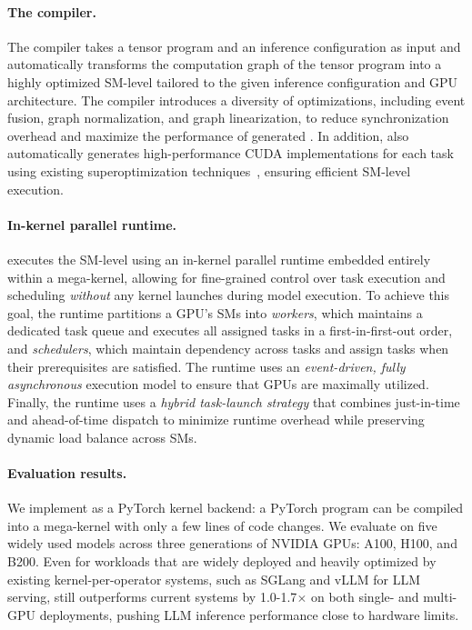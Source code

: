 \paragraph{The \Sys compiler.} The \Sys compiler takes a tensor program and an inference configuration as input and automatically transforms the computation graph of the tensor program into a highly optimized SM-level \graph tailored to the given inference configuration and GPU architecture.
The compiler introduces a diversity of optimizations, including event fusion, graph normalization, and graph linearization, to reduce synchronization overhead and maximize the performance of generated \graphs.
In addition, \Sys also automatically generates high-performance CUDA implementations for each task using existing superoptimization techniques~\cite{wu2025mirage}, ensuring efficient SM-level execution.

\paragraph{In-kernel parallel runtime.} \Sys executes the SM-level \graph using an in-kernel parallel runtime embedded entirely within a mega-kernel, allowing for fine-grained control over task execution and scheduling {\em without} any kernel launches during model execution. To achieve this goal, the runtime partitions a GPU's SMs into {\em workers}, which maintains a dedicated task queue and executes all assigned tasks in a first-in-first-out order, and {\em schedulers}, which maintain dependency across tasks and assign tasks when their prerequisites are satisfied. The \sys runtime uses an {\em event-driven, fully asynchronous} execution model to ensure that GPUs are maximally utilized. Finally, the \sys runtime uses a {\em hybrid task-launch strategy} that combines just-in-time and ahead-of-time dispatch to minimize runtime overhead while preserving dynamic load balance across SMs.

\paragraph{Evaluation results.} We implement \sys as a PyTorch kernel backend: a PyTorch program can be compiled into a \sys mega-kernel with only a few lines of code changes. We evaluate \sys on five widely used models across three generations of NVIDIA GPUs: A100, H100, and B200.
Even for workloads that are widely deployed and heavily optimized by existing kernel-per-operator systems, such as SGLang and vLLM for LLM serving, \sys still outperforms current systems by 1.0-1.7$\times$ on both single- and multi-GPU deployments, pushing LLM inference performance close to hardware limits. 

